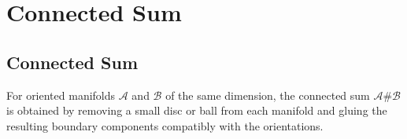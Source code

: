 \chapter{Connected Sum}

\section{Connected Sum}

\begin{definition}
For oriented manifolds $\mathcal{A}$ and $\mathcal{B}$ of the same dimension,
the connected sum $\mathcal{A}\#\mathcal{B}$ is obtained by removing a small
disc or ball from each manifold and gluing the resulting boundary components
compatibly with the orientations.
\end{definition}
